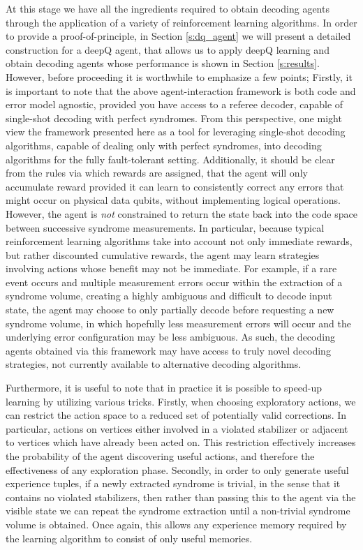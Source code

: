 \documentclass[twocolumn,preprintnumbers,amsmath,amssymb,notitlepage,nofootinbib,longbibliography,superscriptaddress,aps,pra,10pt]{revtex4-1}
\begin{document}
    At this stage we have all the ingredients required to obtain decoding agents through the application of a variety of reinforcement learning algorithms. 
    In order to provide a proof-of-principle, in Section \ref{s:dq_agent} we will present a detailed construction for a deepQ agent, that allows us to apply deepQ learning and obtain decoding agents whose
    performance is shown in Section \ref{s:results}.
    However, before proceeding it is worthwhile to emphasize a few points;
    Firstly, it is important to note that the above agent-interaction framework is both code and error model agnostic, provided you have access to a referee decoder, capable of single-shot decoding with perfect syndromes. 
    From this perspective, one might view the framework presented here as a tool for leveraging single-shot decoding algorithms, capable of dealing only with perfect syndromes, into decoding algorithms for the fully fault-tolerant setting.
    Additionally, it should be clear from the rules via which rewards are assigned, that the agent will only accumulate reward provided it can learn to consistently correct any errors that might occur on physical data qubits, without implementing logical operations.
    However, the agent is \textit{not} constrained to return the state back into the code space between successive syndrome measurements.
    In particular, because typical reinforcement learning algorithms take into account not only immediate rewards, but rather discounted cumulative rewards, the agent may learn strategies involving actions whose benefit may not be immediate.
    For example, if a rare event occurs and multiple measurement errors occur within the extraction of a syndrome volume, creating a highly ambiguous and difficult to decode input state, the agent may choose to only partially decode before requesting a new syndrome volume, in which hopefully less measurement errors will occur and the underlying error configuration may be less ambiguous.
    As such, the decoding agents obtained via this framework may have access to truly novel decoding strategies, not currently available to alternative decoding algorithms.

    Furthermore, it is useful to note that in practice it is possible to speed-up learning by utilizing various tricks.
    Firstly, when choosing exploratory actions, we can restrict the action space to a reduced set of potentially valid corrections.
    In particular, actions on vertices either involved in a violated stabilizer or adjacent to vertices which have already been acted on.
    This restriction effectively increases the probability of the agent discovering useful actions, and therefore the effectiveness of any exploration phase.
    Secondly, in order to only generate useful experience tuples, if a newly extracted syndrome is trivial, in the sense that it contains no violated stabilizers, then rather than passing this to the agent via the visible state we can repeat the syndrome extraction until a non-trivial syndrome volume is obtained.
    Once again, this allows any experience memory required by the learning algorithm to consist of only useful memories.
\end{document}
